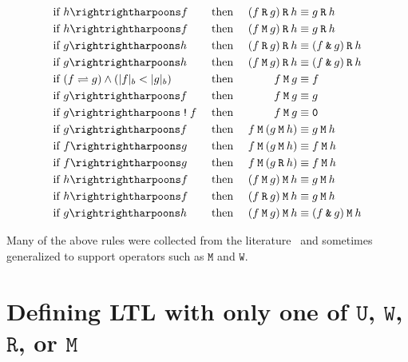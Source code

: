 \documentclass[a4paper,twoside,10pt,DIV=12]{scrreprt}
\newcommand{\U}{\mathbin{\texttt{U}}}
\newcommand{\R}{\mathbin{\texttt{R}}}
\newcommand{\M}{\mathbin{\texttt{M}}}
\newcommand{\W}{\mathbin{\texttt{W}}}
\DeclareMathOperator{\NOT}{\texttt{!}}
\newcommand{\AND}{\mathbin{\texttt{\&}}}
\newcommand{\0}{\texttt{0}}
\newcommand{\1}{\texttt{1}}
\def\simp{\rightrightharpoons}
\begin{document}
\begin{alignat*}{3}
\text{if~} & h\simp f        && \text{~then~} & (f\R g) \R h        & \equiv g \R h          \\
\text{if~} & h\simp f        && \text{~then~} & (f\M g) \R h        & \equiv g \R h          \\
\text{if~} & g\simp h        && \text{~then~} & (f\R g) \R h        & \equiv (f \AND g) \R h \\
\text{if~} & g\simp h        && \text{~then~} & (f\M g) \R h        & \equiv (f \AND g) \R h \\
\text{if~} & \flessg         && \text{~then~} & f\M g               & \equiv f               \\
\text{if~} & g\simp f        && \text{~then~} & f\M g               & \equiv g               \\
\text{if~} & g\simp \NOT f   && \text{~then~} & f\M g               & \equiv \0              \\
\text{if~} & g\simp f        && \text{~then~} & f\M (g \M h)        & \equiv g \M h          \\
\text{if~} & f\simp g        && \text{~then~} & f\M (g \M h)        & \equiv f \M h          \\
\text{if~} & f\simp g        && \text{~then~} & f\M (g \R h)        & \equiv f \M h          \\
\text{if~} & h\simp f        && \text{~then~} & (f\M g) \M h        & \equiv g \M h          \\
\text{if~} & h\simp f        && \text{~then~} & (f\R g) \M h        & \equiv g \M h          \\
\text{if~} & g\simp h        && \text{~then~} & (f\M g) \M h        & \equiv (f \AND g) \M h \\
\end{alignat*}
\endgroup

Many of the above rules were collected from the
literature~\cite{somenzi.00.cav,tauriainen.03.a83,babiak.12.tacas} and
sometimes generalized to support operators such as $\M$ and $\W$.

\appendix
\chapter{Defining LTL with only one of $\U$, $\W$, $\R$, or $\M$}
\label{sec:ltl-equiv}
\end{document}
